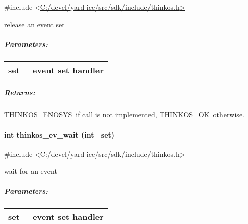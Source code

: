 {{}

{\#include
\textless{}}{\protect\hyperlink{h.pkwqa1}{C:/devel/yard-ice/src/sdk/include/thinkos.h}}{\protect\hyperlink{h.pkwqa1}{\textgreater{}}}

{release an event set }

{}

\subparagraph{\texorpdfstring{{Parameters:}}{Parameters:}}\label{parameters-26}

\protect\hypertarget{t.fa7a662ba3715d766286afd3239f3de6307c79a3}{}{}\protect\hypertarget{t.26}{}{}

\begin{longtable}[]{@{}ll@{}}
\toprule
\begin{minipage}[t]{0.47\columnwidth}\raggedright\strut
{set}{~}\strut
\end{minipage} & \begin{minipage}[t]{0.47\columnwidth}\raggedright\strut
{event set handler }\strut
\end{minipage}\tabularnewline
\bottomrule
\end{longtable}

\subparagraph{\texorpdfstring{{Returns:}}{Returns:}}\label{returns-30}

{\protect\hyperlink{h.3s49zyc}{THINKOS\_ENOSYS}}{\protect\hyperlink{h.3s49zyc}{~}}{if
call is not implemented,
}{\protect\hyperlink{h.2fk6b3p}{THINKOS\_OK}}{\protect\hyperlink{h.2fk6b3p}{~}}{otherwise.
}

\paragraph{\texorpdfstring{{int thinkos\_ev\_wait (int
~set)}}{int thinkos\_ev\_wait (int ~set)}}\label{int-thinkos_ev_wait-int-set}

{}

{\#include
\textless{}}{\protect\hyperlink{h.pkwqa1}{C:/devel/yard-ice/src/sdk/include/thinkos.h}}{\protect\hyperlink{h.pkwqa1}{\textgreater{}}}

{wait for an event }

{}

\subparagraph{\texorpdfstring{{Parameters:}}{Parameters:}}\label{parameters-27}

\protect\hypertarget{t.fa7a662ba3715d766286afd3239f3de6307c79a3}{}{}\protect\hypertarget{t.27}{}{}

\begin{longtable}[]{@{}ll@{}}
\toprule
\begin{minipage}[t]{0.47\columnwidth}\raggedright\strut
{set}{~}\strut
\end{minipage} & \begin{minipage}[t]{0.47\columnwidth}\raggedright\strut
{event set handler }\strut
\end{minipage}\tabularnewline
\bottomrule
\end{longtable}

}
